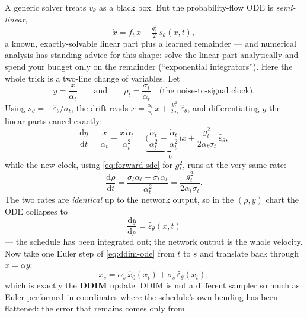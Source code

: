 \documentclass[10pt,a4paper]{article}
\newcommand{\dd}{\mathrm{d}}
\newcommand{\score}{s}
\newcommand{\veps}{\varepsilon}
\begin{document}
A generic solver treats $v_\theta$ as a black box. But the
probability-flow ODE is \emph{semi-linear},
\begin{equation}
\dot x = f_t\, x - \tfrac{g_t^2}{2}\, \score_\theta(x, t),
\end{equation}
a known, exactly-solvable linear part plus a learned remainder --- and
numerical analysis has standing advice for this shape: solve the linear
part analytically and spend your budget only on the remainder
(``exponential integrators''). Here the whole trick is a two-line change
of variables. Let
\begin{equation}
y = \frac{x}{\alpha_t}
\qquad\text{and}\qquad
\rho_t = \frac{\sigma_t}{\alpha_t}
\quad \text{(the noise-to-signal clock).}
\end{equation}
Using $\score_\theta = -\hat\veps_\theta/\sigma_t$, the drift reads
$\dot x = \tfrac{\dot\alpha_t}{\alpha_t}\, x
+ \tfrac{g_t^2}{2\sigma_t}\, \hat\veps_\theta$, and differentiating $y$
the linear parts cancel exactly:
\begin{equation}
\frac{\dd y}{\dd t}
= \frac{\dot x}{\alpha_t} - \frac{x\,\dot\alpha_t}{\alpha_t^2}
= \underbrace{\Big( \frac{\dot\alpha_t}{\alpha_t^2}
- \frac{\dot\alpha_t}{\alpha_t^2} \Big) x}_{=\,0}
+ \frac{g_t^2}{2\alpha_t \sigma_t}\, \hat\veps_\theta ,
\end{equation}
while the new clock, using \eqref{eq:forward-sde} for $g_t^2$, runs at
the very same rate:
\begin{equation}
\frac{\dd \rho}{\dd t}
= \frac{\dot\sigma_t \alpha_t - \sigma_t \dot\alpha_t}{\alpha_t^2}
= \frac{g_t^2}{2\alpha_t \sigma_t} .
\end{equation}
The two rates are \emph{identical} up to the network output, so in
the $(\rho, y)$ chart the ODE collapses to
\begin{equation}
\boxed{\;\frac{\dd y}{\dd \rho} = \hat\veps_\theta(x, t)\;}
\label{eq:ddim-ode}
\end{equation}
--- the schedule has been integrated out; the network output is the
whole velocity. Now take one Euler step of \eqref{eq:ddim-ode} from $t$
to $s$ and translate back through $x = \alpha y$:
\begin{equation}
x_s = \alpha_s\, \hat x_0(x_t) + \sigma_s\, \hat\veps_\theta(x_t),
\label{eq:ddim}
\end{equation}
which is exactly the \textbf{DDIM} update. DDIM is not a different
sampler so much as Euler performed in coordinates where the schedule's
own bending has been flattened: the error that remains comes only from
\end{document}
